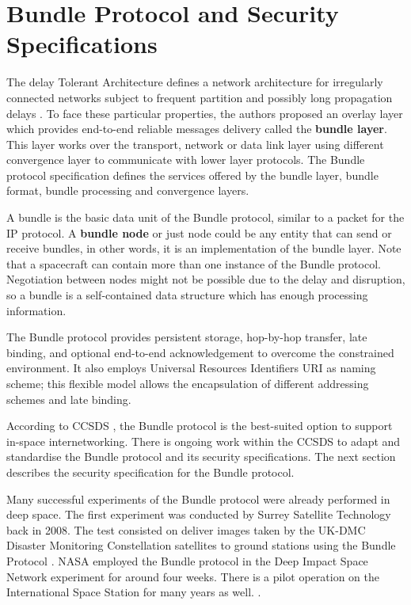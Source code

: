 \section{Bundle Protocol and Security Specifications}
\label{sec:dtn}

The delay Tolerant Architecture defines a network architecture for irregularly connected networks subject to frequent partition and possibly long propagation delays \cite{cerf2007delay}. To face these particular properties, the authors proposed an overlay layer which provides end-to-end reliable messages delivery called the \textbf{bundle layer}. This layer works over the transport, network or data link layer using different convergence layer to communicate with lower layer protocols. The Bundle protocol specification \cite{rfc5050} defines the services offered by the bundle layer, bundle format, bundle processing and convergence layers. 

A bundle is the basic data unit of the Bundle protocol, similar to a packet for the IP protocol. A \textbf{bundle node} or just node could be any entity that can send or receive bundles, in other words, it is an implementation of the bundle layer. Note that a spacecraft can contain more than one instance of the Bundle protocol. Negotiation between nodes might not be possible due to the delay and disruption, so a bundle is a self-contained data structure which has enough processing information.


The Bundle protocol provides persistent storage, hop-by-hop transfer, late binding, and optional end-to-end acknowledgement to overcome the constrained environment. It also employs Universal Resources Identifiers URI as naming scheme; this flexible model allows the encapsulation of different addressing schemes and late binding. 

According to CCSDS \cite{rationale2010requirements}, the Bundle protocol is the best-suited option to support in-space internetworking. There is ongoing work within the CCSDS to adapt and standardise the Bundle protocol and its security specifications. The next section describes the security specification for the Bundle protocol. 

Many successful experiments of the Bundle protocol were already performed in deep space. The first experiment was conducted by Surrey Satellite Technology back in 2008. The test consisted on deliver images taken by the UK-DMC Disaster Monitoring Constellation satellites to ground stations using the Bundle Protocol \cite{ivancic2010experience}. NASA employed the Bundle protocol in the Deep Impact Space Network experiment for around four weeks. There is a pilot operation on the International Space Station for many years as well. \cite{araniti2015contact}.    


